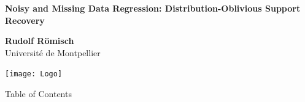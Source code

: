 \documentclass[unknownkeysallowed]{beamer}
\begin{document}



\begin{frame}
\bigskip
\bigskip
\begin{center}{
\LARGE\color{marron}
\textbf{Noisy and Missing Data Regression: Distribution-Oblivious Support Recovery}
\textbf{ }\\
\vspace{0.5cm}
}

\color{marron}
\textbf{}
\end{center}

\vspace{0.5cm}

\begin{center}
\textbf{Rudolf Römisch} \\
\vspace{0.1cm}
\vspace{0.5cm}
Université de Montpellier \\
\end{center}

\centering
\texttt{[image: Logo]}

\end{frame}






\begin{frame}{Table of Contents}
\tableofcontents[hideallsubsections]
\end{frame}


\end{document}

